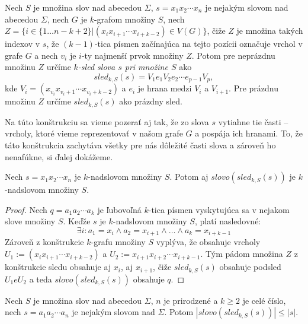 \begin{defn}
    Nech $S$ je množina slov nad abecedou $\Sigma$, $s = x_1 x_2 \cdots x_n$ je nejakým slovom nad abecedou $\Sigma$,
    nech $G$ je $k$-grafom množiny $S$, nech \\
    $Z = \{ i \in \{1 \ldots n - k + 2 \} | (x_i x_{i+1} \cdots x_{i+k-2}) \in V(G) \}$, čiže $Z$ je množina takých indexov v $s$, že
    $(k-1)$-tica písmen začínajúca na tejto pozícii označuje vrchol v grafe $G$
    a nech $v_i$ je $i$-ty najmenší prvok množiny $Z$. Potom pre neprázdnu množinu $Z$ určíme \textit{$k$-sled slova $s$ pri množine $S$} ako
    $$sled_{k,S}(s) = V_1 e_1 V_2 e_2 \cdots e_{p-1} V_p,$$
    kde $V_i = (x_{v_i} x_{v_i + 1} \cdots x_{v_i + k - 2})$ a $e_i$ je hrana medzi $V_i$ a $V_{i+1}$. Pre prázdnu
    množinu $Z$ určíme $sled_{k, S}(s)$ ako prázdny sled.
\end{defn}

Na túto konštrukciu sa vieme pozerať aj tak, že zo slova $s$ vytiahne tie časti -- vrcholy, ktoré vieme reprezentovať
v našom grafe $G$ a pospája ich hranami. To, že táto konštrukcia zachytáva všetky pre nás dôležité časti slova
a zároveň ho nenafúkne, si ďalej dokážeme.

\begin{veta}
    Nech $s = x_1 x_2 \cdots x_n$ je $k$-nadslovom množiny $S$. Potom aj $slovo(sled_{k,S}(s))$ je
    $k$-nadslovom množiny $S$.
\end{veta}

\begin{proof}
    Nech $q = a_1 a_2 \cdots a_k$ je ľubovoľná $k$-tica písmen vyskytujúca sa v nejakom slove množiny $S$.
    Keďže $s$ je $k$-nadslovom množiny $S$, platí nasledovné: 
    $$\exists i : a_1 = x_i \wedge a_2 = x_{i+1} \wedge \ldots \wedge a_k = x_{i+k-1}$$
    Zároveň z konštrukcie $k$-grafu množiny $S$ vyplýva, že obsahuje vrcholy \\
    $U_1 := (x_i x_{i+1} \cdots x_{i+k-2})$
    a $U_2 := x_{i+1} x_{i+2} \cdots x_{i+k-1}$. Tým pádom množina $Z$ z konštrukcie sledu obsahuje aj $x_i$, aj
    $x_{i+1}$, čiže $sled_{k,S}(s)$ obsahuje podsled $U_1 e U_2$ a teda $slovo (sled_{k,S}(s))$ obsahuje $q$.
\end{proof}

\begin{veta}
    Nech $S$ je množina slov nad abecedou $\Sigma$, $n$ je prirodzené a $k \ge 2$ je celé číslo, nech $s = a_1 a_2 \cdots a_n$ je
    nejakým slovom nad $\Sigma$. Potom $|slovo(sled_{k,S}(s))| \leq |s|.$
\end{veta}

